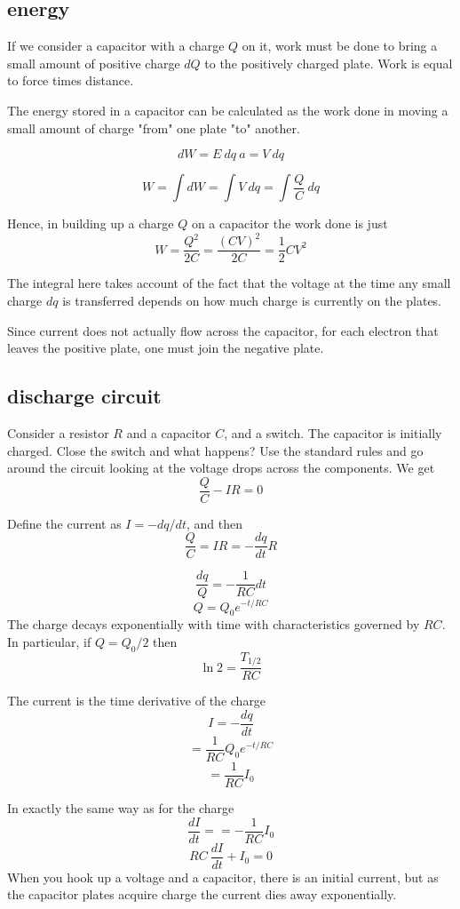 \documentclass[11pt, oneside]{article}
\begin{document}
\subsection*{energy}
If we consider a capacitor with a charge $Q$ on it, work must be done to bring a small amount of positive charge $dQ$ to the positively charged plate.  Work is equal to force times distance.

The energy stored in a capacitor can be calculated as the work done in moving a small amount of charge "from" one plate "to" another.

\[ dW = E \ dq \ a = V \ dq \]

\[ W = \int dW = \int V \ dq = \int \frac{Q}{C} \ dq \]

Hence, in building up a charge $Q$ on a capacitor the work done is just
\[ W = \frac{Q^2}{2C} = \frac{(CV)^2}{2C} = \frac{1}{2}CV^2 \]

The integral here takes account of the fact that the voltage at the time any small charge $dq$ is transferred depends on how much charge is currently on the plates.

Since current does not actually flow across the capacitor, for each electron that leaves the positive plate, one must join the negative plate.  

\subsection*{discharge circuit}
Consider a resistor $R$ and a capacitor $C$, and a switch.  The capacitor is initially charged.  Close the switch and what happens?  Use the standard rules and go around the circuit looking at the voltage drops across the components.  We get
\[ \frac{Q}{C} - IR = 0 \]

Define the current as $I = - dq/dt$, and then
\[ \frac{Q}{C} = IR = -\frac{dq}{dt} R \]

\[ \frac{dq}{Q} = -\frac{1}{RC} dt \]
\[ Q = Q_0 e^{-t/RC} \]
The charge decays exponentially with time with characteristics governed by $RC$.  In particular, if $Q = Q_0/2$ then
\[ \ln 2 = \frac{T_{1/2}}{RC} \]

The current is the time derivative of the charge
\[ I = - \frac{dq}{dt}  \]
\[ = \frac{1}{RC} Q_0 e^{-t/RC} \]
\[ = \frac{1}{RC} I_0 \]

In exactly the same way as for the charge
\[ \frac{dI}{dt} = = -\frac{1}{RC} I_0 \]
\[ RC\ \frac{dI}{dt} + I_0 = 0 \]
When you hook up a voltage and a capacitor, there is an initial current, but as the capacitor plates acquire charge the current dies away exponentially.
\end{document}
